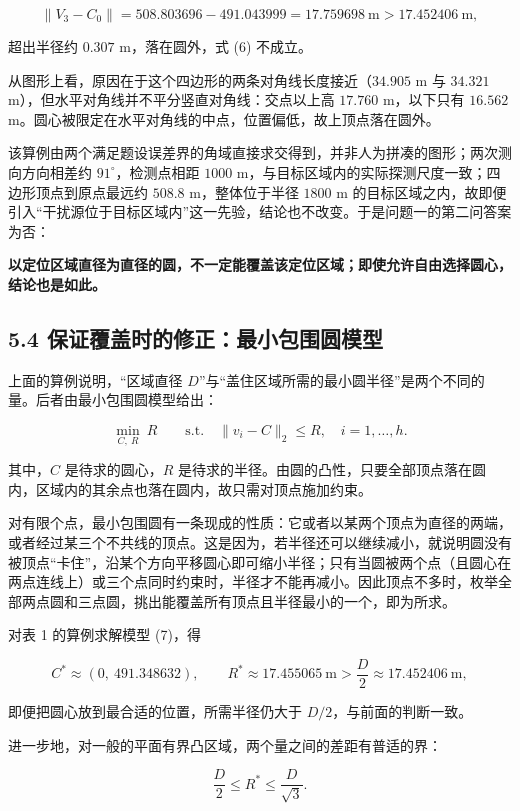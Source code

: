 \documentclass[UTF8,a4paper,zihao=-4,fontset=fandol]{ctexart}
\begin{document}
\[
\|V_3-C_0\|=508.803696-491.043999=17.759698\ \text{m}>17.452406\ \text{m},
\]

超出半径约 $0.307$ m，落在圆外，式 (6) 不成立。

从图形上看，原因在于这个四边形的两条对角线长度接近（$34.905$ m 与 $34.321$ m），但水平对角线并不平分竖直对角线：交点以上高 $17.760$ m，以下只有 $16.562$ m。圆心被限定在水平对角线的中点，位置偏低，故上顶点落在圆外。

该算例由两个满足题设误差界的角域直接求交得到，并非人为拼凑的图形；两次测向方向相差约 $91^\circ$，检测点相距 $1000$ m，与目标区域内的实际探测尺度一致；四边形顶点到原点最远约 $508.8$ m，整体位于半径 $1800$ m 的目标区域之内，故即便引入“干扰源位于目标区域内”这一先验，结论也不改变。于是问题一的第二问答案为否：

\textbf{以定位区域直径为直径的圆，不一定能覆盖该定位区域；即使允许自由选择圆心，结论也是如此。}

\subsection*{5.4 保证覆盖时的修正：最小包围圆模型}

上面的算例说明，“区域直径 $D$”与“盖住区域所需的最小圆半径”是两个不同的量。后者由最小包围圆模型给出：

\[
\min_{C,\ R}\ R
\qquad\text{s.t.}\quad\|v_i-C\|_2\le R,\quad i=1,\dots,h . \tag{7}
\]

其中，$C$ 是待求的圆心，$R$ 是待求的半径。由圆的凸性，只要全部顶点落在圆内，区域内的其余点也落在圆内，故只需对顶点施加约束。

对有限个点，最小包围圆有一条现成的性质：它或者以某两个顶点为直径的两端，或者经过某三个不共线的顶点。这是因为，若半径还可以继续减小，就说明圆没有被顶点“卡住”，沿某个方向平移圆心即可缩小半径；只有当圆被两个点（且圆心在两点连线上）或三个点同时约束时，半径才不能再减小。因此顶点不多时，枚举全部两点圆和三点圆，挑出能覆盖所有顶点且半径最小的一个，即为所求。

对表 1 的算例求解模型 (7)，得

\[
C^*\approx(0,\ 491.348632),\qquad
R^*\approx17.455065\ \text{m}>\frac D2\approx17.452406\ \text{m},
\]

即便把圆心放到最合适的位置，所需半径仍大于 $D/2$，与前面的判断一致。

进一步地，对一般的平面有界凸区域，两个量之间的差距有普适的界：

\[
\frac D2\le R^*\le\frac{D}{\sqrt3}. \tag{8}
\]
\end{document}
